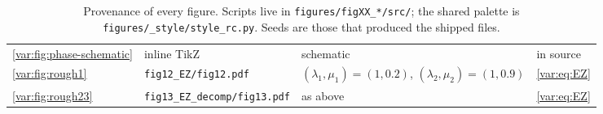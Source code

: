 \begin{table}[!htbp]
\begin{tabular}{@{}l>{\raggedright\arraybackslash}p{}>{\raggedright\arraybackslash}p{}l@{}}
\cref{var:fig:phase-schematic} & inline TikZ
  & schematic & in source \\
\cref{var:fig:rough1} & \texttt{fig12\_EZ/fig12.pdf}
  & $(\lambda_1,\mu_1)=(1,0.2)$, $(\lambda_2,\mu_2)=(1,0.9)$ & \cref{var:eq:EZ} \\
\cref{var:fig:rough23} & \texttt{fig13\_EZ\_decomp/fig13.pdf}
  & as above & \cref{var:eq:EZ} \\
\bottomrule
\end{tabular}
\caption{Provenance of every figure. Scripts live in
\texttt{figures/figXX\_*/src/}; the shared palette is
\texttt{figures/\_style/style\_rc.py}. Seeds are those that produced the
shipped files.}
\label{var:tab:figrecord}
\end{table}

\FloatBarrier
